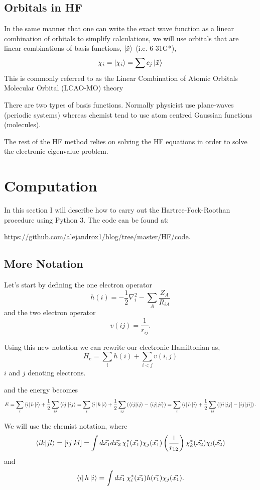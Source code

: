 \documentclass[a4paper]{article}
\begin{document}
\subsection{Orbitals in HF}
In the same manner that one can write the exact wave function as a linear combination of orbitals to simplify calculations, we will use orbitals that are linear combinations of basis functions, $\ket{\tilde{x}}$ (i.e. 6-31G*),
$$
\chi_i = \ket{\chi_i} = \sum c_j \ket{\tilde{x}}
$$
This is commonly referred to as the Linear Combination of Atomic Orbitals Molecular Orbital (LCAO-MO) theory 

There are two types of basis functions.
Normally physicist use plane-waves (periodic systems) whereas chemist tend to use atom centred Gaussian functions (molecules).

The rest of the HF method relies on solving the HF equations in order to solve the electronic eigenvalue problem.

\section{Computation}
In this section I will describe how to carry out the Hartree-Fock-Roothan procedure using Python 3.
The code can be found at:

\url{https://github.com/alejandrox1/blog/tree/master/HF/code}. 

\subsection{More Notation}
Let's start by defining the one electron operator
$$
h(i) = -\frac{1}{2}\nabla^{2}_{i} - \sum_A \frac{Z_A}{R_{iA}}
$$
and the two electron operator
$$
v(ij) = \frac{1}{r_{ij}}.
$$

Using this new notation we can rewrite our electronic Hamiltonian as,
$$
H_{e} = \sum_i h(i) + \sum_{i<j} v(i,j) 
$$
$i$ and $j$ denoting electrons.

and the energy becomes
\begin{dmath} \label{H}
E = \sum_i \bra{i}h\ket{i} + \frac{1}{2}\sum_{ij} \braket{ij || ij}
= \sum_i \bra{i}h\ket{i} + \frac{1}{2}\sum_{ij} \left( \braket{ij|ij} - \braket{ij|ji} \right)
= \sum_i \bra{i}h\ket{i} + \frac{1}{2}\sum_{ij} \left( \left[ii|jj\right] - \left[ij|ji\right]\right).
\end{dmath}

We will use the chemist notation, where
$$
\braket{ik|jl} = \left[ij|kl\right] = \int d\vec{x_1}d\vec{x_2} \, \chi^{*}_{i}(\vec{x_1}) \chi_{j}(\vec{x_1}) \left(\frac{1}{r_{12}}\right) \chi^{*}_{k}(\vec{x_2}) \chi_{l}(\vec{x_2})
$$
and
$$
\bra{i}h\ket{i} = \int d\vec{x_1} \, \chi^{*}_{i} (\vec{x_1}) h(\vec{r_1}) \chi_{j} (\vec{x_1}).
$$
\end{document}
